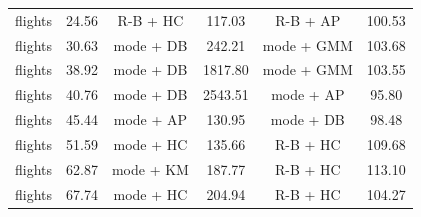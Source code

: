 \documentclass[10pt]{article} %
\numberwithin{equation}{section}
\begin{document}
\begin{table}[htbp]
\begin{subtable}{0.48\linewidth}
\begin{tabular}{lccccc}
            flights & 24.56 & R-B + HC   & 117.03 & R-B + AP   & 100.53 \\
            flights & 30.63 & mode + DB  & 242.21 & mode + GMM & 103.68 \\
            flights & 38.92 & mode + DB  & 1817.80 & mode + GMM & 103.55 \\
            flights & 40.76 & mode + DB  & 2543.51 & mode + AP  & 95.80 \\
            flights & 45.44 & mode + AP  & 130.95 & mode + DB  & 98.48 \\
            flights & 51.59 & mode + HC  & 135.66 & R-B + HC   & 109.68 \\
            flights & 62.87 & mode + KM  & 187.77 & R-B + HC   & 113.10 \\
            flights & 67.74 & mode + HC  & 204.94 & R-B + HC   & 104.27 \\
            \bottomrule
        \end{tabular}
    \end{subtable}

    \vspace{0.5em} %


\end{table}
\end{document}
